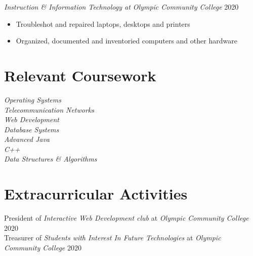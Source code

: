 \documentclass[line]{docs/resume/res}
\begin{document}
\begin{resume}
  {\sl Instruction \& Information Technology at Olympic Community College} \hfill 2020
  \begin{itemize} \itemsep -2pt
    \item Troubleshot and repaired laptops, desktops and printers
    \item Organized, documented and inventoried computers and other hardware
  \end{itemize}

\section{Relevant Coursework}
  {\sl Operating Systems } \\
  {\sl Telecommunication Networks } \\
  {\sl Web Development } \\
  {\sl Database Systems } \\
  {\sl Advanced Java} \\
  {\sl C++} \\
  {\sl Data Structures \& Algorithms}

\section{Extracurricular Activities}
  President of {\it Interactive Web Development club} at {\it Olympic Community College} \hfill 2020 \\
  Treasurer of {\it Students with Interest In Future Technologies} at {\it Olympic Community College} \hfill 2020

\end{resume}
\end{document}
